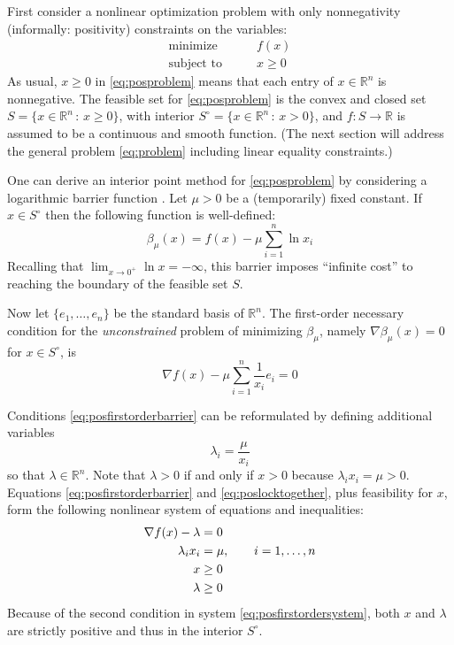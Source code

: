 \documentclass[11pt]{article}
\newcommand{\RR}{\mathbb{R}}
\newcommand{\grad}{\nabla}
\begin{document}
First consider a nonlinear optimization problem with only nonnegativity (informally: positivity) constraints on the variables:
\begin{equation}
\begin{matrix}
\text{minimize} \qquad & f(x) \\
\text{subject to} \qquad & x \ge 0
\end{matrix} \label{eq:posproblem}
\end{equation}
As usual, $x\ge 0$ in \eqref{eq:posproblem} means that each entry of $x\in\RR^n$ is nonnegative.  The feasible set for \eqref{eq:posproblem} is the convex and closed set $S = \{x\in \RR^n\,:\,x\ge 0\}$, with interior $S^\circ = \{x\in \RR^n\,:\,x > 0\}$, and $f:S \to \RR$ is assumed to be a continuous and smooth function.  (The next section will address the general problem \eqref{eq:problem} including linear equality constraints.)

One can derive an interior point method for \eqref{eq:posproblem} by considering a logarithmic barrier function \cite[section 16.2]{GrivaNashSofer2009}.  Let $\mu>0$ be a (temporarily) fixed constant.  If $x\in S^\circ$ then the following function is well-defined:
\begin{equation}
\beta_\mu(x) = f(x) - \mu \sum_{i=1}^n \ln x_i \label{eq:posbarrierfunction}
\end{equation}
Recalling that $\lim_{x\to 0^+} \ln x = -\infty$, this barrier imposes ``infinite cost'' to reaching the boundary of the feasible set $S$.

Now let $\{e_1,\dots,e_n\}$ be the standard basis of $\RR^n$.  The first-order necessary condition for the \emph{unconstrained} problem of minimizing $\beta_\mu$, namely $\grad \beta_\mu(x)=0$ for $x \in S^\circ$, is
\begin{equation}
\grad f(x) - \mu \sum_{i=1}^n \frac{1}{x_i} e_i = 0 \label{eq:posfirstorderbarrier}
\end{equation}

Conditions \eqref{eq:posfirstorderbarrier} can be reformulated by defining additional variables
\begin{equation}
\lambda_i = \frac{\mu}{x_i} \label{eq:poslocktogether}
\end{equation}
so that $\lambda\in\RR^n$.  Note that $\lambda>0$ if and only if $x>0$ because $\lambda_i x_i = \mu > 0$.  Equations \eqref{eq:posfirstorderbarrier} and \eqref{eq:poslocktogether}, plus feasibility for $x$, form the following nonlinear system of equations and inequalities:
\begin{align}
\grad f(x) - \lambda &= 0 \label{eq:posfirstordersystem} \\
\lambda_i x_i &= \mu, \qquad i=1,\dots,n \notag \\
x &\ge 0 \notag \\
\lambda &\ge 0 \notag
\end{align}
Because of the second condition in system \eqref{eq:posfirstordersystem}, both $x$ and $\lambda$ are strictly positive and thus in the interior $S^\circ$.
\end{document}
